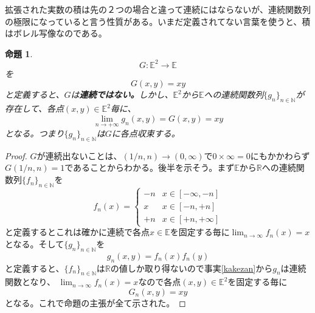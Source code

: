 \documentclass[leqno]{jsarticle}
\newtheorem{prop}[thm]{命題}
\newcommand{\nn}{\mathbb{N}}
\newcommand{\rr}{\mathbb{R}}
\newcommand{\mgn}{\infty}
\newcommand{\dpst}{\displaystyle}
\newcommand{\ffnn}{\{f_{n}\}_{n\in \nn}}
\newcommand{\rrr}{\mathbb{E}}
\begin{document}
拡張された実数の積は先の２つの場合と違って連続にはならないが、連続関数列の極限になっていると言う性質がある。いまだ定義されてない言葉を使うと、積はボレル写像なのである。
\begin{prop}
\[
G:\rrr^2\to \rrr
\]
を
\[
G(x,y)=xy
\]
と定義すると、$G$は{\bf 連続ではない。}しかし、$\rrr^2$から$\rrr$への連続関数列$\{g_{n}\}_{n\in\nn}$が存在して、各点$(x,y)\in \rrr^2$毎に、
\[
\lim_{n\to+\mgn}g_{n}(x,y)=G(x,y)=xy
\]
となる。つまり$\{g_{n}\}_{n\in\nn}$は$G$に各点収束する。
\end{prop}
\begin{proof}
$G$が連続出ないことは、$\dpst (1/n,n)\to (0,\mgn)$で$0\times \mgn=0$にもかかわらず$\dpst G(1/n,n)=1$であることからわかる。後半を示そう。まず$\rrr$から$\rr$への連続関数列$\ffnn$を
\[
f_n(x)=
\begin{cases}
-n & \text{$x\in [-\mgn,-n]$}\\ 
x & \text{$x\in [-n,+n]$}\\ 
+n & \text{$x\in [+n,+\mgn]$}
\end{cases}
\]
と定義するとこれは確かに連続で各点$x\in\rrr$を固定する毎に$\dpst \lim_{n\to \mgn}f_n(x)=x$となる。そして$\{g_n\}_{n\in \nn}$を
\[
g_n(x,y)=f_n(x)f_n(y)
\]
と定義すると、$\ffnn$は$\rr$の値しか取り得ないので事実\ref{kakezan}から$g_n$は連続関数となり、
$\dpst \lim_{n\to \mgn}f_n(x)=x$なので各点$(x,y)\in \rrr^2$を固定する毎に
\[
G_n(x,y)=xy
\]
となる。これで命題の主張が全て示された。


\end{proof}







			
\end{document}
